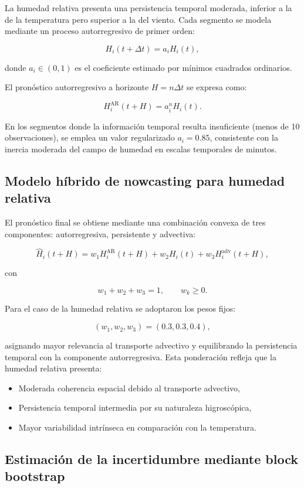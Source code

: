 \documentclass[
  spanish,
  us-letterpaper,
]{scrreprt}
\providecommand{\tightlist}{%
  \setlength{\itemsep}{0pt}\setlength{\parskip}{0pt}}
\numberwithin{equation}{section}
\begin{document}
La humedad relativa presenta una persistencia temporal moderada,
inferior a la de la temperatura pero superior a la del viento. Cada
segmento se modela mediante un proceso autorregresivo de primer orden:

\[
H_i(t+\Delta t) = a_i H_i(t),
\]

donde \(a_i \in (0,1)\) es el coeficiente estimado por mínimos cuadrados
ordinarios.

El pronóstico autorregresivo a horizonte \(H = n\Delta t\) se expresa
como:

\[
H_i^{\text{AR}}(t+H) = a_i^{n} H_i(t).
\]

En los segmentos donde la información temporal resulta insuficiente
(menos de 10 observaciones), se emplea un valor regularizado
\(a_i = 0.85\), consistente con la inercia moderada del campo de humedad
en escalas temporales de minutos.

\subsection{Modelo híbrido de nowcasting para humedad
relativa}\label{modelo-huxedbrido-de-nowcasting-para-humedad-relativa}

El pronóstico final se obtiene mediante una combinación convexa de tres
componentes: autorregresiva, persistente y advectiva:

\[
\hat{H}_i(t+H) = w_1 H_i^{\text{AR}}(t+H) + w_2 H_i(t) + w_3 H_i^{\text{adv}}(t+H),
\]

con

\[
w_1 + w_2 + w_3 = 1, \qquad w_k \ge 0.
\]

Para el caso de la humedad relativa se adoptaron los pesos fijos:

\[
(w_1, w_2, w_3) = (0.3, 0.3, 0.4),
\]

asignando mayor relevancia al transporte advectivo y equilibrando la
persistencia temporal con la componente autorregresiva. Esta ponderación
refleja que la humedad relativa presenta:

\begin{itemize}
\tightlist
\item
  Moderada coherencia espacial debido al transporte advectivo,
\item
  Persistencia temporal intermedia por su naturaleza higroscópica,
\item
  Mayor variabilidad intrínseca en comparación con la temperatura.
\end{itemize}

\subsection{Estimación de la incertidumbre mediante block
bootstrap}\label{estimaciuxf3n-de-la-incertidumbre-mediante-block-bootstrap-1}
\end{document}

